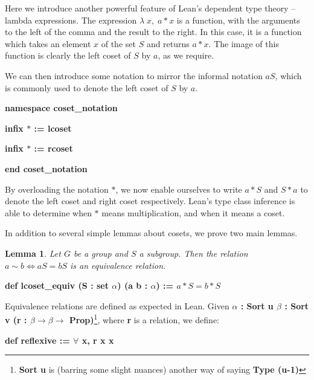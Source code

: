 \documentclass[runningheads,a4paper]{llncs}
\renewcommand{\a}{\alpha}
\renewcommand{\b}{\beta}
\renewcommand{\l}{\lambda}
\renewcommand{\-}{\setminus}
\newtheorem{lemma}[theorem]{Lemma}
\begin{document}
Here we introduce another powerful feature of Lean's dependent type theory -- lambda expressions. The expression $\l\; x,\; a * x$ is a function, with the arguments to the left of the comma and the result to the right. In this case, it is a function which takes an element $x$ of the set $S$ and returns $a * x$. The image of this function is clearly the left coset of $S$ by $a$, as we require.

We can then introduce some notation to mirror the informal notation $aS$, which is commonly used to denote the left coset of $S$ by $a$.

\vspace{2 mm}
\hspace{2 em}\textbf{namespace coset\_notation}

\hspace{4 em}\textbf{infix $*$ := lcoset}

\hspace{4 em}\textbf{infix $*$ := rcoset}

\hspace{2 em}\textbf{end coset\_notation}
\vspace{2 mm}

By overloading the notation $*$, we now enable ourselves to write $a * S$ and $S * a$ to denote the left coset and right coset respectively. Lean's type class inference is able to determine when $*$ means multiplication, and when it means a coset.

In addition to several simple lemmas about cosets, we prove two main lemmas.

\begin{lemma}
Let $G$ be a group and $S$ a subgroup. Then the relation $a \sim b \iff aS = bS$ is an equivalence relation.
\end{lemma}

\vspace{2 mm}
\hspace{2 em}\textbf{def lcoset\_equiv (S : set $\a$) (a b : $\a$) := $a * S = b * S$}
\vspace{2 mm}

Equivalence relations are defined as expected in Lean. Given \textbf{{$\a$ : Sort u} {$\b$ : Sort v} (r : $\b \to \b \to$ Prop)}\footnote{\textbf{Sort u} is (barring some slight nuances) another way of saying \textbf{Type (u-1)}}, where \textbf{r} is a relation, we define:

\vspace{2 mm}
\hspace{2 em}\textbf{def reflexive := $\forall$ x, r x x}
\end{document}

